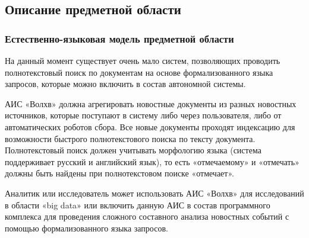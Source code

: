 \clearpage
\subsection{Описание предметной области}
\subsubsection{Естественно-языковая модель предметной области}

На данный момент существует очень мало систем, позволяющих проводить полнотекстовый поиск по документам на основе формализованного языка запросов, которые можно включить в состав автономной системы.

АИС «Волхв» должна агрегировать новостные документы из разных новостных источников, которые поступают в систему либо через пользователя, либо от автоматических роботов сбора. Все новые документы проходят индексацию для возможности быстрого полнотекстового поиска по тексту документа. Полнотекстовый поиск должен учитывать морфологию языка (система поддерживает русский и английский язык), то есть «отмечаемому» и «отмечать» должны быть найдены при полнотекстовом поиске «отмечает».

Аналитик или исследователь может использовать АИС «Волхв» для исследований в области «big data» или включить данную АИС в состав программного комплекса для проведения сложного составного анализа новостных событий с помощью формализованного языка запросов. 


